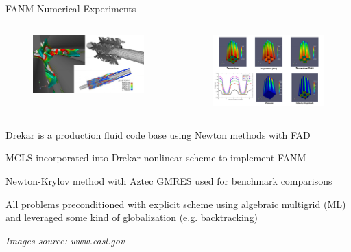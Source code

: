 \documentclass{beamer}
\begin{document}
\begin{frame}{FANM Numerical Experiments}

  \begin{columns}
    \begin{column}{0.5\textwidth}
      \begin{figure}[htpb!]
        \begin{center}
          \includegraphics[width=2.0in]{drekar1.png}
        \end{center}
      \end{figure}
    \end{column}

    \begin{column}{0.5\textwidth}
      \begin{figure}[htpb!]
        \begin{center}
          \includegraphics[width=2.0in]{drekar2.png}
        \end{center}
      \end{figure}
    \end{column}
  \end{columns}

  \medskip

  \begin{itemize}
    {\small
    \item Drekar is a production fluid code base using Newton methods
      with FAD
      \medskip
    \item MCLS incorporated into Drekar nonlinear scheme to implement
      FANM
      \medskip
    \item Newton-Krylov method with Aztec GMRES used for benchmark
      comparisons
    \item All problems preconditioned with explicit scheme using
      algebraic multigrid (ML) and leveraged some kind of
      globalization (e.g. backtracking) 
    }
  \end{itemize}

  {\small \sl Images source: www.casl.gov}

\end{frame}
\end{document}
